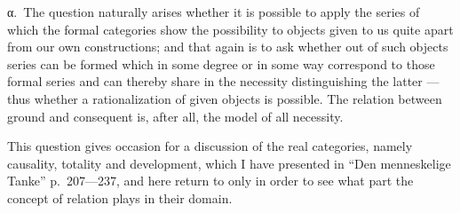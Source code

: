 \documentclass[12pt]{article}
\begin{document}
%
\label{sec:3c-alpha}%
α.~The question naturally arises whether it is possible to apply the series
of which the formal categories show the possibility to objects given to us
quite apart from our own constructions; and that again is to ask whether out
of such objects series can be formed which in some degree or in some way
correspond to those formal series and can thereby share in the necessity
distinguishing the latter --- thus whether a rationalization of given
objects is possible. The relation between ground and consequent is, after
all, the model of all necessity.

This question gives occasion for a discussion of the real categories, namely
causality, totality and development, which I have presented in ``Den
menneskelige Tanke'' p.~207---237, and here return to only in order to see
what part the concept of relation plays in their domain.
\end{document}
